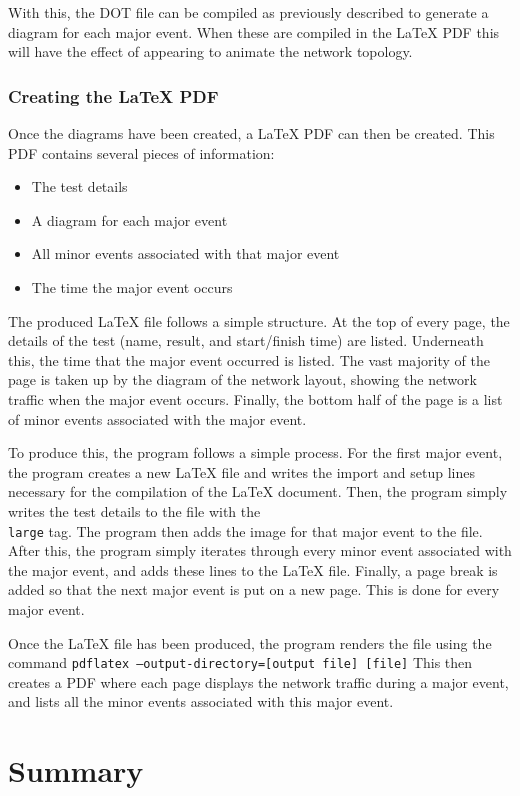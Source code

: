 With this, the DOT file can be compiled as previously described to generate a diagram for each major event.
When these are compiled in the LaTeX PDF this will have the effect of appearing to animate the network topology.


\subsubsection{Creating the LaTeX PDF}
Once the diagrams have been created, a LaTeX PDF can then be created.
This PDF contains several pieces of information:
\begin{itemize}
    \item The test details
    \item A diagram for each major event
    \item All minor events associated with that major event
    \item The time the major event occurs
\end{itemize}
The produced LaTeX file follows a simple structure.
At the top of every page, the details of the test (name, result, and start/finish time) are listed.
Underneath this, the time that the major event occurred is listed. 
The vast majority of the page is taken up by the diagram of the network layout, showing the network traffic when the major event occurs.
Finally, the bottom half of the page is a list of minor events associated with the major event.

To produce this, the program follows a simple process.
For the first major event, the program creates a new LaTeX file and writes the import and setup lines necessary for the compilation of the LaTeX document.
Then, the program simply writes the test details to the file with the \texttt{\\large} tag.
The program then adds the image for that major event to the file. 
After this, the program simply iterates through every minor event associated with the major event, and adds these lines to the LaTeX file.
Finally, a page break is added so that the next major event is put on a new page.
This is done for every major event.

Once the LaTeX file has been produced, the program renders the file using the command
\texttt{pdflatex --output-directory=[output file] [file]}
This then creates a PDF where each page displays the network traffic during a major event, and lists all the minor events associated with this major event.

\section{Summary}

